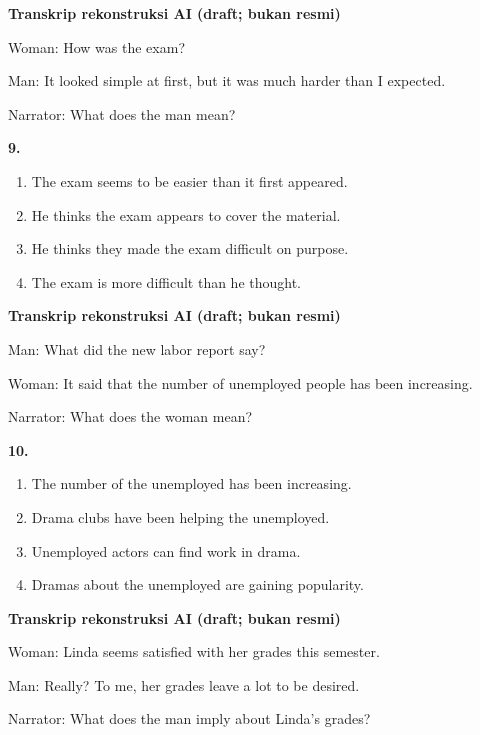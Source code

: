 \documentclass[12pt]{article}
\begin{document}
\par
\vspace{0.25\baselineskip}
\begin{exampleblock}
\textbf{Transkrip rekonstruksi AI (draft; bukan resmi)}\par
Woman: How was the exam?\par
Man: It looked simple at first, but it was much harder than I expected.\par
Narrator: What does the man mean?\par
\end{exampleblock}
\noindent\textbf{9.}
\begin{enumerate}[label=(\Alph*),leftmargin=*,itemsep=0.2em]
\item The exam seems to be easier than it first appeared.
\item He thinks the exam appears to cover the material.
\item He thinks they made the exam difficult on purpose.
\item The exam is more difficult than he thought.
\end{enumerate}
\par
\vspace{0.25\baselineskip}
\begin{exampleblock}
\textbf{Transkrip rekonstruksi AI (draft; bukan resmi)}\par
Man: What did the new labor report say?\par
Woman: It said that the number of unemployed people has been increasing.\par
Narrator: What does the woman mean?\par
\end{exampleblock}
\noindent\textbf{10.}
\begin{enumerate}[label=(\Alph*),leftmargin=*,itemsep=0.2em]
\item The number of the unemployed has been increasing.
\item Drama clubs have been helping the unemployed.
\item Unemployed actors can find work in drama.
\item Dramas about the unemployed are gaining popularity.
\end{enumerate}
\par
\vspace{0.25\baselineskip}
\begin{exampleblock}
\textbf{Transkrip rekonstruksi AI (draft; bukan resmi)}\par
Woman: Linda seems satisfied with her grades this semester.\par
Man: Really? To me, her grades leave a lot to be desired.\par
Narrator: What does the man imply about Linda's grades?\par
\end{exampleblock}
\end{document}
